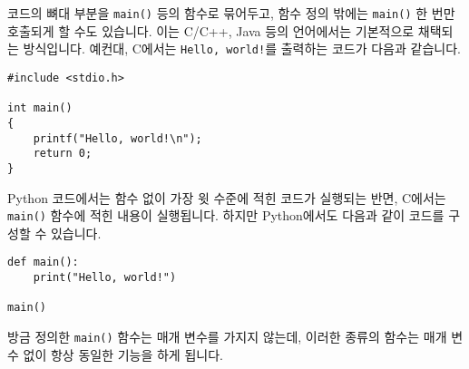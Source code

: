 \documentclass[../main.tex]{subfiles}
\begin{document}
코드의 뼈대 부분을 \texttt{main()} 등의 함수로 묶어두고, 함수 정의 밖에는
\texttt{main()} 한 번만 호출되게 할 수도 있습니다.  이는 C/C++, Java 등의
언어에서는 기본적으로 채택되는 방식입니다.  예컨대, C에서는 \texttt{Hello,
world!}를 출력하는 코드가 다음과 같습니다.
\begin{verbatim}
#include <stdio.h>

int main()
{
    printf("Hello, world!\n");
    return 0;
}
\end{verbatim}
Python 코드에서는 함수 없이 가장 윗 수준에 적힌 코드가 실행되는 반면, C에서는
\texttt{main()} 함수에 적힌 내용이 실행됩니다.  하지만 Python에서도 다음과 같이
코드를 구성할 수 있습니다.
\begin{verbatim}
def main():
    print("Hello, world!")

main()
\end{verbatim}
방금 정의한 \texttt{main()} 함수는 매개 변수를 가지지 않는데, 이러한 종류의
함수는 매개 변수 없이 항상 동일한 기능을 하게 됩니다.
\end{document}
